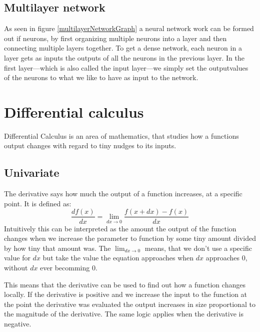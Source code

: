 \subsection{Multilayer network}
As seen in figure \ref{multilayerNetworkGraph} a neural network work can be formed out if neurons, by first organizing multiple neurons into a layer and then connecting multiple layers together. To get a dense network, each neuron in a layer gets as inputs the outputs of all the neurons in the previous layer. In the first layer---which is also called the input layer---we simply set the outputvalues of the neurons to what we like to have as input to the network.

\section{Differential calculus}
Differential Calculus is an area of mathematics, that studies how a functions output changes with regard to tiny nudges to its inputs.

\subsection{Univariate}
The derivative says how much the output of a function increases, at a specific point. It is defined as:
\begin{equation}
	\frac{df(x)}{dx} = \lim_{dx \to 0}\frac{f(x + dx) - f(x)}{dx}
\end{equation}
Intuitively this can be interpreted as the amount the output of the function changes when we increase the parameter to function by some tiny amount divided by how tiny that amount was. The $\lim_{dx \to 0}$ means, that we don't use a specific value for $dx$ but take the value the equation approaches when $dx$ approaches $0$, without $dx$ ever becomming $0$.

This means that the derivative can be used to find out how a function changes locally. If the derivative is positive and we increase the input to the function at the point the derivative was evaluated the output increases in size proportional to the magnitude of the derivative. The same logic applies when the derivative is negative.

